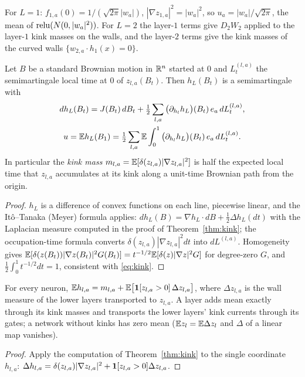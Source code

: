 \begin{example}
For $L=1$: $f_{1,a}(0)=1/(\sqrt{2\pi}|w_a|)$, $|\nabla z_{1,a}|^2=|w_a|^2$, so $u_a=|w_a|/\sqrt{2\pi}$, the mean of
$\operatorname{relu}(N(0,|w_a|^2))$. For $L=2$ the layer-$1$ terms give $D_2W_2$ applied to the layer-$1$ kink masses on the walls, and
the layer-$2$ terms give the kink masses of the curved walls $\{w_{2,a}\cdot h_1(x)=0\}$.
\end{example}

\begin{theorem}\label{thm:tanaka}
Let $B$ be a standard Brownian motion in $\mathbb R^n$ started at $0$ and $L^{(l,a)}_t$ the semimartingale local time at $0$ of
$z_{l,a}(B_t)$. Then $h_L(B_t)$ is a semimartingale with
\begin{gather*}
dh_L(B_t)=J(B_t)\,dB_t+\tfrac12\sum_{l,a}\big(\partial_{h_l}h_L\big)(B_t)\,e_a\,dL^{(l,a)}_t,\\
u=\mathbb E h_L(B_1)=\tfrac12\sum_{l,a}\mathbb E\int_0^1\big(\partial_{h_l}h_L\big)(B_t)\,e_a\,dL^{(l,a)}_t .
\end{gather*}
In particular the \emph{kink mass} $m_{l,a}=\mathbb E[\delta(z_{l,a})|\nabla z_{l,a}|^2]$ is half the expected local time that
$z_{l,a}$ accumulates at its kink along a unit-time Brownian path from the origin.
\end{theorem}
\begin{proof}
$h_L$ is a difference of convex functions on each line, piecewise linear, and the It\^o--Tanaka (Meyer) formula
applies: $dh_L(B)=\nabla h_L\cdot dB+\tfrac12\Delta h_L(dt)$ with the Laplacian measure computed in the proof of
Theorem~\ref{thm:kink}; the occupation-time formula converts $\delta(z_{l,a})|\nabla z_{l,a}|^2dt$ into $dL^{(l,a)}$.
Homogeneity gives $\mathbb E[\delta(z(B_t))|\nabla z(B_t)|^2G(B_t)]=t^{-1/2}\mathbb E[\delta(z)|\nabla z|^2G]$ for degree-zero $G$, and
$\tfrac12\int_0^1t^{-1/2}dt=1$, consistent with \eqref{eq:kink}.
\end{proof}

\begin{corollary}\label{cor:created}
For every neuron, $\mathbb E h_{l,a}=m_{l,a}+\mathbb E\big[\mathbf 1[z_{l,a}>0]\,\Delta z_{l,a}\big]$, where $\Delta z_{l,a}$ is the
wall measure of the lower layers transported to $z_{l,a}$. A layer adds mean exactly through its kink masses and
transports the lower layers' kink currents through its gates; a network without kinks has zero mean
($\mathbb E z_l=\mathbb E\Delta z_l$ and $\Delta$ of a linear map vanishes).
\end{corollary}
\begin{proof}
Apply the computation of Theorem~\ref{thm:kink} to the single coordinate $h_{l,a}$:
$\Delta h_{l,a}=\delta(z_{l,a})|\nabla z_{l,a}|^2+\mathbf 1[z_{l,a}>0]\Delta z_{l,a}$.
\end{proof}

